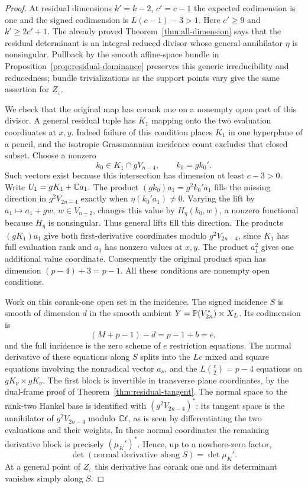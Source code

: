\begin{proof}
At residual dimensions $k'=k-2$, $c'=c-1$ the expected codimension
is one and the signed codimension is $L(c-1)-3>1$.
Here $c'\ge9$ and $k'\ge2c'+1$. The already proved
Theorem~\ref{thm:all-dimension} says that the residual determinant
is an integral reduced divisor whose general annihilator $\eta$ is
nonsingular. Pullback by the smooth affine-space bundle in
Proposition~\ref{prop:residual-dominance} preserves this generic
irreducibility and reducedness; bundle trivializations as the support
points vary give the same assertion for $Z_\varepsilon$.

We check that the original map has corank one on a nonempty open part
of this divisor. A general residual tuple has $K_1$ mapping onto the
two evaluation coordinates at $x,y$. Indeed failure of this condition
places $K_1$ in one hyperplane of a pencil, and the isotropic
Grassmannian incidence count excludes that closed subset. Choose a
nonzero
\[
 k_0\in K_1\cap gV_{n-4},\qquad k_0=gk_0'.
\]
Such vectors exist because this intersection has dimension at least
$c-3>0$. Write $U_1=gK_1+\mathbb C a_1$.
The product $(gk_0)a_1=g^2k_0'a_1$ fills the missing direction in
$g^2V_{2n-4}$ exactly when $\eta(k_0'a_1)\ne0$.
Varying the lift by $a_1\mapsto a_1+gw$, $w\in V_{n-2}$,
changes this value by $H_\eta(k_0,w)$, a nonzero functional because
$H_\eta$ is nonsingular. Thus general lifts fill this direction.
The products $(gK_1)a_1$ give both first-derivative coordinates modulo
$g^2V_{2n-4}$, since $K_1$ has full evaluation rank and $a_1$ has
nonzero values at $x,y$. The product $a_1^2$ gives one additional value
coordinate. Consequently the original product span has dimension
$(p-4)+3=p-1$. All these conditions are nonempty open conditions.

Work on this corank-one open set in the incidence. The signed
incidence $S$ is smooth of dimension $d$ in the smooth ambient
$Y=\mathbb P(V_{2n}^*)\times X_L$. Its codimension is
\[
 (M+p-1)-d=p-1+b=e,
\]
and the full incidence is the zero scheme of $e$ restriction equations.
The normal derivative of these equations along $S$ splits into the
$Lc$ mixed and square equations involving the nonradical vector
$a_\nu$, and the $L\binom c2=p-4$ equations on
$gK_\nu\times gK_\nu$. The first block is invertible in transverse
plane coordinates, by the dual-frame proof of
Theorem~\ref{thm:residual-tangent}. The normal space to the rank-two
Hankel base is identified with $(g^2V_{2n-4})^*$: its tangent space
is the annihilator of $g^2V_{2n-4}$ modulo $\mathbb C\ell$, as is seen by
differentiating the two evaluations and their weights. In these
normal coordinates the remaining derivative block is precisely
$(\mu_K')^*$. Hence, up to a nowhere-zero factor,
\begin{equation}\label{eq:normal-determinant}
 \det(\text{normal derivative along }S)=\det\mu_K'.
\end{equation}
At a general point of $Z_\varepsilon$ this derivative has corank one
and its determinant vanishes simply along $S$.


\end{proof}
